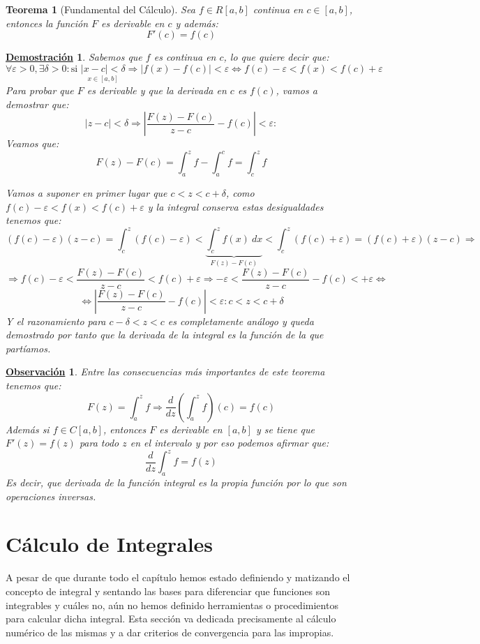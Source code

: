 \documentclass[10pt,a4paper,openright]{book}
\theoremstyle{break}
\newtheorem{theo}{Teorema}[chapter]
\newtheorem*{demo}{\underline{Demostración}}
\newtheorem{obs}{\underline{Observación}}[chapter]
\newcommand{\dif}[1]{\ d#1}
\begin{document}
\begin{theo}[Fundamental del Cálculo]
Sea $f\in R[a,b]$ continua en $c\in [a,b]$, entonces la función $F$ es derivable en $c$ y además:
$$F'(c) = f(c)$$
\end{theo}
\begin{demo}
Sabemos que $f$ es continua en $c$, lo que quiere decir que:
$$\forall \varepsilon > 0, \exists \delta > 0: \mbox{si }  \underset {x \in [a,b]}{|x-c|<\delta} \Rightarrow |f(x) - f(c)|<\varepsilon  \Leftrightarrow
 f(c)-\varepsilon < f(x)<f(c)+ \varepsilon$$
Para probar que $F$ es derivable y que la derivada en $c$ es $f(c)$, vamos a demostrar que:
$$|z-c|<\delta \Rightarrow \left| \frac{F(z) - F(c)}{z-c} - f(c) \right| < \varepsilon: $$
Veamos que:
$$F(z) - F(c) =  \int_{a}^{z} f - \int_{a}^{c} f = \int_{c}^{z} f$$

Vamos a suponer en primer lugar que $c<z<c+\delta$, como $f(c)-\varepsilon < f(x)<f(c)+ \varepsilon$ y la integral conserva estas desigualdades tenemos que:
$$(f(c) - \varepsilon)(z-c) = \int_{c}^{z} (f(c)-\varepsilon) < \underbrace{\int_{c}^{z} f(x)\dif{x}}_{F(z) - F(c)} < \int_{c}^{z} (f(c)+\varepsilon) = (f(c) + \varepsilon)(z-c) \Rightarrow  $$
$$\Rightarrow f(c) - \varepsilon < \frac{F(z) - F(c)}{z-c} < f(c) + \varepsilon \Rightarrow - \varepsilon < \frac{F(z) - F(c)}{z-c} - f(c) < + \varepsilon \Leftrightarrow$$
$$\Leftrightarrow \left| \frac{F(z) - F(c)}{z-c} - f(c) \right| < \varepsilon: c < z < c+\delta$$
Y el razonamiento para $c-\delta < z <c$ es completamente análogo y queda demostrado por tanto que la derivada de la integral es la función de la que partíamos.
\end{demo}

\begin{obs}
Entre las consecuencias más importantes de este teorema tenemos que:
$$F(z) = \int_{a}^{z} f\Rightarrow \frac{d}{dz}\left(\int_{a}^{z} f\right) (c) = f(c)$$
Además si $f\in C[a,b]$, entonces $F$ es derivable en $[a,b]$ y se tiene que $F'(z) = f(z)$ para todo $z$ en el intervalo y por eso podemos afirmar que:
$$\frac{d}{dz} \int_{a}^{z} f = f(z)$$
Es decir, que derivada de la función integral es la propia función por lo que son operaciones inversas.
\end{obs}

\section{Cálculo de Integrales}
A pesar de que durante todo el capítulo hemos estado definiendo y matizando el concepto de integral y sentando las bases para diferenciar que funciones son integrables y cuáles no, aún no hemos definido herramientas o procedimientos para calcular dicha integral. Esta sección va dedicada precisamente al cálculo numérico de las mismas y a dar criterios de convergencia para las impropias. 
\end{document}
